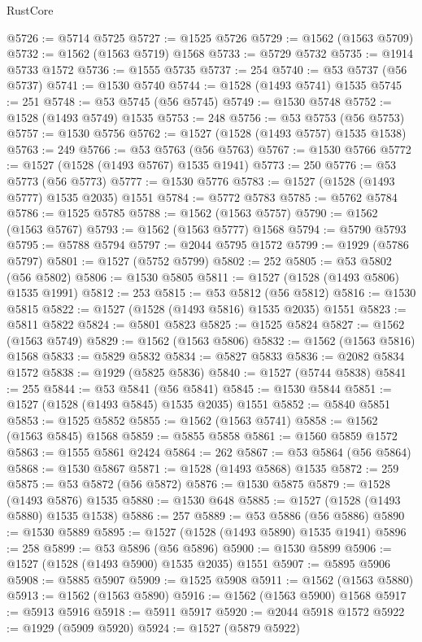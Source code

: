\begin{lexlean}{RustCore}
\begin{coremodule}
@5726 := @5714 @5725
@5727 := @1525 @5726
@5729 := @1562 (@1563 @5709)
@5732 := @1562 (@1563 @5719) @1568
@5733 := @5729 @5732
@5735 := @1914 @5733 @1572
@5736 := @1555 @5735
@5737 := 254
@5740 := @53 @5737 (@56 @5737)
@5741 := @1530 @5740
@5744 := @1528 (@1493 @5741) @1535
@5745 := 251
@5748 := @53 @5745 (@56 @5745)
@5749 := @1530 @5748
@5752 := @1528 (@1493 @5749) @1535
@5753 := 248
@5756 := @53 @5753 (@56 @5753)
@5757 := @1530 @5756
@5762 := @1527 (@1528 (@1493 @5757) @1535 @1538)
@5763 := 249
@5766 := @53 @5763 (@56 @5763)
@5767 := @1530 @5766
@5772 := @1527 (@1528 (@1493 @5767) @1535 @1941)
@5773 := 250
@5776 := @53 @5773 (@56 @5773)
@5777 := @1530 @5776
@5783 := @1527 (@1528 (@1493 @5777) @1535 @2035) @1551
@5784 := @5772 @5783
@5785 := @5762 @5784
@5786 := @1525 @5785
@5788 := @1562 (@1563 @5757)
@5790 := @1562 (@1563 @5767)
@5793 := @1562 (@1563 @5777) @1568
@5794 := @5790 @5793
@5795 := @5788 @5794
@5797 := @2044 @5795 @1572
@5799 := @1929 (@5786 @5797)
@5801 := @1527 (@5752 @5799)
@5802 := 252
@5805 := @53 @5802 (@56 @5802)
@5806 := @1530 @5805
@5811 := @1527 (@1528 (@1493 @5806) @1535 @1991)
@5812 := 253
@5815 := @53 @5812 (@56 @5812)
@5816 := @1530 @5815
@5822 := @1527 (@1528 (@1493 @5816) @1535 @2035) @1551
@5823 := @5811 @5822
@5824 := @5801 @5823
@5825 := @1525 @5824
@5827 := @1562 (@1563 @5749)
@5829 := @1562 (@1563 @5806)
@5832 := @1562 (@1563 @5816) @1568
@5833 := @5829 @5832
@5834 := @5827 @5833
@5836 := @2082 @5834 @1572
@5838 := @1929 (@5825 @5836)
@5840 := @1527 (@5744 @5838)
@5841 := 255
@5844 := @53 @5841 (@56 @5841)
@5845 := @1530 @5844
@5851 := @1527 (@1528 (@1493 @5845) @1535 @2035) @1551
@5852 := @5840 @5851
@5853 := @1525 @5852
@5855 := @1562 (@1563 @5741)
@5858 := @1562 (@1563 @5845) @1568
@5859 := @5855 @5858
@5861 := @1560 @5859 @1572
@5863 := @1555 @5861 @2424
@5864 := 262
@5867 := @53 @5864 (@56 @5864)
@5868 := @1530 @5867
@5871 := @1528 (@1493 @5868) @1535
@5872 := 259
@5875 := @53 @5872 (@56 @5872)
@5876 := @1530 @5875
@5879 := @1528 (@1493 @5876) @1535
@5880 := @1530 @648
@5885 := @1527 (@1528 (@1493 @5880) @1535 @1538)
@5886 := 257
@5889 := @53 @5886 (@56 @5886)
@5890 := @1530 @5889
@5895 := @1527 (@1528 (@1493 @5890) @1535 @1941)
@5896 := 258
@5899 := @53 @5896 (@56 @5896)
@5900 := @1530 @5899
@5906 := @1527 (@1528 (@1493 @5900) @1535 @2035) @1551
@5907 := @5895 @5906
@5908 := @5885 @5907
@5909 := @1525 @5908
@5911 := @1562 (@1563 @5880)
@5913 := @1562 (@1563 @5890)
@5916 := @1562 (@1563 @5900) @1568
@5917 := @5913 @5916
@5918 := @5911 @5917
@5920 := @2044 @5918 @1572
@5922 := @1929 (@5909 @5920)
@5924 := @1527 (@5879 @5922)

\end{coremodule}
\end{lexlean}

